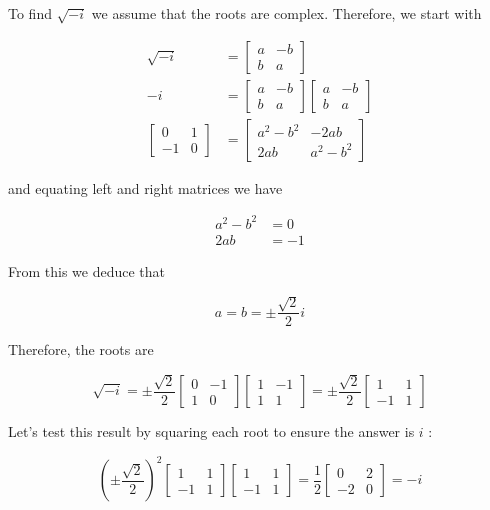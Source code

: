 To find $\sqrt{-i}$ we assume that the roots are complex. Therefore, we start with

$$
\begin{aligned}
\sqrt{-i} & =\left[\begin{array}{cc}
a & -b \\
b & a
\end{array}\right] \\
-i & =\left[\begin{array}{cc}
a & -b \\
b & a
\end{array}\right]\left[\begin{array}{cc}
a & -b \\
b & a
\end{array}\right] \\
{\left[\begin{array}{cc}
0 & 1 \\
-1 & 0
\end{array}\right] } & =\left[\begin{array}{cc}
a^{2}-b^{2} & -2 a b \\
2 a b & a^{2}-b^{2}
\end{array}\right]
\end{aligned}
$$

and equating left and right matrices we have

$$
\begin{aligned}
a^{2}-b^{2} & =0 \\
2 a b & =-1
\end{aligned}
$$

From this we deduce that

$$
a=b= \pm \frac{\sqrt{2}}{2} i
$$

Therefore, the roots are

$$
\sqrt{-i}= \pm \frac{\sqrt{2}}{2}\left[\begin{array}{cc}
0 & -1 \\
1 & 0
\end{array}\right]\left[\begin{array}{cc}
1 & -1 \\
1 & 1
\end{array}\right]= \pm \frac{\sqrt{2}}{2}\left[\begin{array}{cc}
1 & 1 \\
-1 & 1
\end{array}\right]
$$

Let's test this result by squaring each root to ensure the answer is $i$ :

$$
\left( \pm \frac{\sqrt{2}}{2}\right)^{2}\left[\begin{array}{cc}
1 & 1 \\
-1 & 1
\end{array}\right]\left[\begin{array}{cc}
1 & 1 \\
-1 & 1
\end{array}\right]=\frac{1}{2}\left[\begin{array}{cc}
0 & 2 \\
-2 & 0
\end{array}\right]=-i
$$

